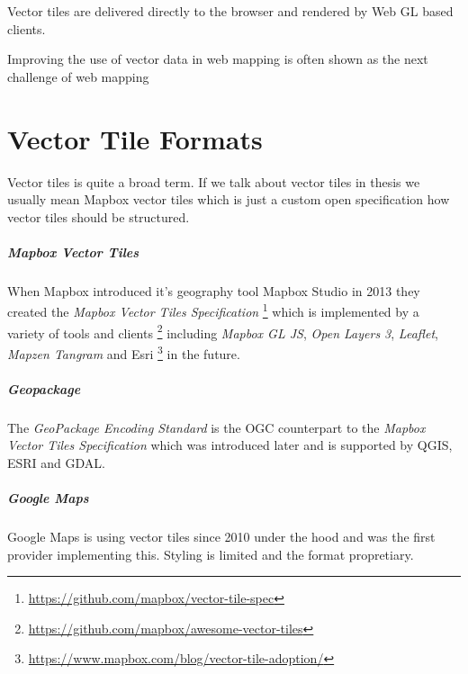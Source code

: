 Vector tiles are delivered directly to the browser and rendered by Web
GL based clients.


Improving the use of vector data in web mapping is often shown as the next challenge
of web mapping \cite[p.~88]{gaffuri2012toward} 

\chapter{Vector Tile Formats}
\label{vector-tile-formats}

Vector tiles is quite a broad term. If we talk about vector tiles in thesis we usually mean Mapbox vector tiles which is just a custom open specification how vector tiles should be structured.

\paragraph{Mapbox Vector Tiles}

When Mapbox introduced it's geography tool Mapbox Studio in 2013 they
created the \emph{Mapbox Vector Tiles Specification}
\footnote{\url{https://github.com/mapbox/vector-tile-spec}} which is
implemented by a variety of tools and clients
\footnote{\url{https://github.com/mapbox/awesome-vector-tiles}}
including \emph{Mapbox GL JS}, \emph{Open Layers 3}, \emph{Leaflet},
\emph{Mapzen Tangram} and Esri
\footnote{\url{https://www.mapbox.com/blog/vector-tile-adoption/}} in
the future.

\paragraph{Geopackage}

The \emph{GeoPackage Encoding Standard} is the OGC counterpart to the
\emph{Mapbox Vector Tiles Specification} which was introduced later and
is supported by QGIS, ESRI and GDAL.

\paragraph{Google Maps}

Google Maps is using vector tiles since 2010 under the hood and was the
first provider implementing this. Styling is limited and the format
propretiary.